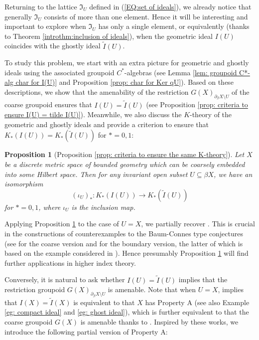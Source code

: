 \documentclass[12pt, a4paper]{amsart}
\numberwithin{equation}{section}
\newtheorem{alphprop}[alphthm]{Proposition}
\theoremstyle{definition}
\theoremstyle{remark}
\begin{document}
Returning to the lattice $\mathfrak{I}_U$ defined in (\ref{EQ:set of ideals}), we already notice that generally $\mathfrak{I}_U$ consists of more than one element. Hence it will be interesting and important to explore when $\mathfrak{I}_U$ has only a single element, or equivalently (thanks to Theorem \ref{introthm:inclusion of ideals}), when the geometric ideal $I(U)$ coincides with the ghostly ideal $\tilde{I}(U)$. 

To study this problem, we start with an extra picture for geometric and ghostly ideals using the associated groupoid $C^*$-algebras (see Lemma \ref{lem: groupoid C*-alg char for I(U)} and Proposition \ref{prop: char for Ker qU}). Based on these descriptions, we show that the amenability of the restriction $G(X)_{\partial_\beta X \setminus U}$ of the coarse groupoid ensures that $I(U) = \tilde{I}(U)$ (see Proposition \ref{prop: criteria to ensure I(U) = tilde I(U)}). Meanwhile, we also discuss the $K$-theory of the geometric and ghostly ideals and provide a criterion to ensure that $K_\ast(I(U)) = K_\ast(\tilde{I}(U))$ for $\ast=0,1$:

\begin{alphprop}[Proposition \ref{prop: criteria to ensure the same K-theory}]\label{introprop:K-theory}
Let $X$ be a discrete metric space of bounded geometry which can be coarsely embedded into some Hilbert space. Then for any invariant open subset $U \subseteq \beta X$, we have an isomorphism
\[
(\iota_U)_\ast: K_\ast(I(U)) \longrightarrow K_\ast(\tilde{I}(U))
\]
for $\ast =0,1$, where $\iota_U$ is the inclusion map. 
\end{alphprop}

Applying Proposition \ref{introprop:K-theory} to the case of $U=X$, we partially recover \cite[Proposition 35]{Fin14}. This is crucial in the constructions of counterexamples to the Baum-Connes type conjectures (see \cite{STY02} for the coarse version and \cite[Section 5]{FW14} for the boundary version, the latter of which is based on the example considered in \cite[Section 3]{Wan07}). Hence presumably Proposition \ref{introprop:K-theory} will find further applications in higher index theory. 



Conversely, it is natural to ask whether $I(U) = \tilde{I}(U)$ implies that the restriction groupoid $G(X)_{\partial_\beta X \setminus U}$ is amenable. Note that when $U=X$, \cite[Theorem 1.3]{RW14} implies that $I(X) = \tilde{I}(X)$ is equivalent to that $X$ has Property A (see also Example \ref{eg: compact ideal} and \ref{eg: ghost ideal}), which is further equivalent to that the coarse groupoid $G(X)$ is amenable thanks to \cite[Theorem 5.3]{STY02}. Inspired by these works, we introduce the following partial version of Property A:
\end{document}

